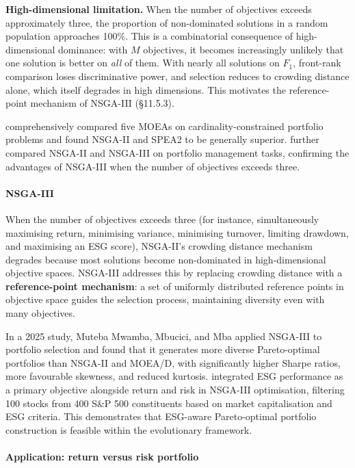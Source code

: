 \textbf{High-dimensional limitation.} When the number of objectives exceeds approximately three, the proportion of non-dominated solutions in a random population approaches 100\%. This is a combinatorial consequence of high-dimensional dominance: with $M$ objectives, it becomes increasingly unlikely that one solution is better on \textit{all} of them. With nearly all solutions on $F_1$, front-rank comparison loses discriminative power, and selection reduces to crowding distance alone, which itself degrades in high dimensions. This motivates the reference-point mechanism of NSGA-III (§11.5.3).

\cite{Anagnostopoulos2011} comprehensively compared five MOEAs on cardinality-constrained portfolio problems and found NSGA-II and SPEA2 to be generally superior. \cite{Awad2022} further compared NSGA-II and NSGA-III on portfolio management tasks, confirming the advantages of NSGA-III when the number of objectives exceeds three.

\paragraph{NSGA-III}

When the number of objectives exceeds three (for instance, simultaneously maximising return, minimising variance, minimising turnover, limiting drawdown, and maximising an ESG score), NSGA-II's crowding distance mechanism degrades because most solutions become non-dominated in high-dimensional objective spaces. NSGA-III \citep{Deb2014} addresses this by replacing crowding distance with a \textbf{reference-point mechanism}: a set of uniformly distributed reference points in objective space guides the selection process, maintaining diversity even with many objectives.

In a 2025 study, Muteba Mwamba, Mbucici, and Mba \citep{MutebaMwamba2025} applied NSGA-III to portfolio selection and found that it generates more diverse Pareto-optimal portfolios than NSGA-II and MOEA/D, with significantly higher Sharpe ratios, more favourable skewness, and reduced kurtosis. \cite{LarniFooeik2025} integrated ESG performance as a primary objective alongside return and risk in NSGA-III optimisation, filtering 100 stocks from 400 S\&P 500 constituents based on market capitalisation and ESG criteria. This demonstrates that ESG-aware Pareto-optimal portfolio construction is feasible within the evolutionary framework.

\paragraph{Application: return versus risk portfolio}

